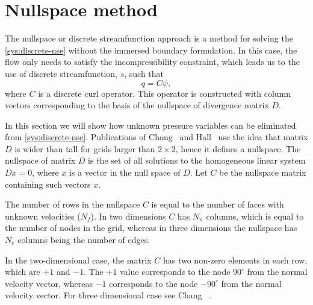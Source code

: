 \documentclass{article}
\numberwithin{equation}{section}
\begin{document}
\section{Nullspace method}\label{sec:nullspace}


The nullspace or discrete streamfunction approach \cite{Chang:2002,Hall:1980} is a method for solving the \cref{sys:discrete-nse} without the immersed boundary formulation. In this case, the flow only needs to satisfy the incompressibility constraint, which leads us to the use of discrete streamfunction, $s$, such that
\begin{equation}
	q = C\psi,
\end{equation}
where $C$ is a discrete curl operator. This operator is constructed with column vectors corresponding to the basis of the nullspace of divergence matrix $D$.

In this section we will show how unknown pressure variables can be eliminated from \cref{sys:discrete-nse}. Publications of Chang~\cite{Chang:2002} and Hall~\cite{Hall:1980} use the idea that matrix $D$ is wider than tall for grids larger than $2\times 2$, hence it defines a nullspace. The nullspace of matrix $D$ is the set of all solutions to the homogeneous linear system $Dx = 0$, where $x$ is a vector in the null space of $D$. Let $C$ be the nullspace matrix containing such vectors $x$. 

The number of rows in the nullspace $C$ is equal to the number of faces with unknown velocities ($N_f$). In two dimensions $C$ has $N_n$ columns, which is equal to the number of nodes in the grid, whereas in three dimensions the nullspace has $N_e$ columns being the number of edges. 

In the two-dimensional case, the matrix $C$ has two non-zero elements in each row, which are $+1$ and $-1$. The $+1$ value corresponds to the node $90^\circ$ from the normal velocity vector, whereas $-1$ corresponds to the node $-90^\circ$ from the normal velocity vector.  For three dimensional case see Chang ~\cite{Chang:2002}.
\end{document}
